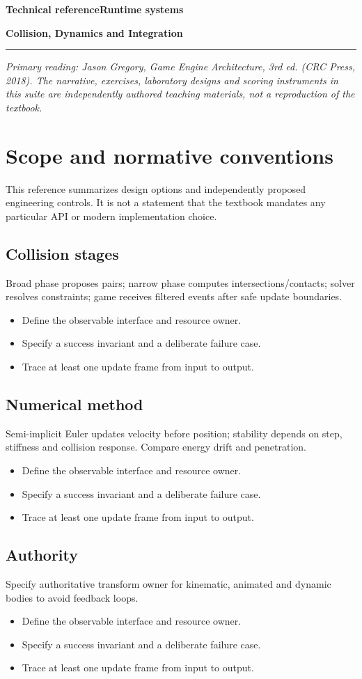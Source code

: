 \documentclass[11pt,letterpaper]{article}
\newcommand{\DocType}{Reference}
\newcommand{\SuiteHeading}[3]{%
\renewcommand{\DocType}{#2}%
{\small\bfseries\sffamily\color{EngineTeal}#2\hfill #3}\par\vspace{6pt}
{\LARGE\bfseries\color{EngineBlue}#1}\par\vspace{4pt}
{\color{EngineTeal}\rule{\linewidth}{1pt}}\par\vspace{7pt}}
\newcommand{\SourceNote}{\footnotesize\textit{Primary reading: Jason Gregory, \emph{Game Engine Architecture}, 3rd ed. (CRC Press, 2018). The narrative, exercises, laboratory designs and scoring instruments in this suite are independently authored teaching materials, not a reproduction of the textbook.}\normalsize\par}
\begin{document}
\SuiteHeading{Collision, Dynamics and Integration}{Technical reference}{Runtime systems}
\SourceNote
\section{Scope and normative conventions}
This reference summarizes design options and independently proposed engineering controls. It is not a statement that the textbook mandates any particular API or modern implementation choice.

\subsection{Collision stages}
Broad phase proposes pairs; narrow phase computes intersections/contacts; solver resolves constraints; game receives filtered events after safe update boundaries.

\begin{itemize}
\item Define the observable interface and resource owner.
\item Specify a success invariant and a deliberate failure case.
\item Trace at least one update frame from input to output.
\end{itemize}
\subsection{Numerical method}
Semi-implicit Euler updates velocity before position; stability depends on step, stiffness and collision response. Compare energy drift and penetration.

\begin{itemize}
\item Define the observable interface and resource owner.
\item Specify a success invariant and a deliberate failure case.
\item Trace at least one update frame from input to output.
\end{itemize}
\subsection{Authority}
Specify authoritative transform owner for kinematic, animated and dynamic bodies to avoid feedback loops.

\begin{itemize}
\item Define the observable interface and resource owner.
\item Specify a success invariant and a deliberate failure case.
\item Trace at least one update frame from input to output.
\end{itemize}
\end{document}
